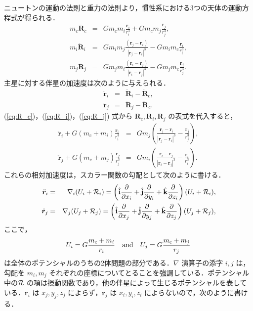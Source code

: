 \documentclass[11pt,a4paper,oneside,onecolumn]{jreport}
\begin{document}
ニュートンの運動の法則と重力の法則より，慣性系における3つの天体の運動方程式が得られる．
\begin{eqnarray}
m_c \ddot{\bm R}_c & = & G m_c m_i \frac{{\bm r}_i}{r_i^3} + G m_c m_j \frac{{\bm r}_j}{r_j^3}, \label{eq:R_c}\\
m_i \ddot{\bm R}_i & = & G m_i m_j \frac{({\bm r}_j - {\bm r}_i)}{|{\bm r}_j - {\bm r}_i|^3} - G m_i m_c \frac{{\bm r}_i}{r_i^3}, \label{eq:R_i}\\
m_j \ddot{\bm R}_j & = & G m_j m_i \frac{({\bm r}_i - {\bm r}_j)}{|{\bm r}_i - {\bm r}_j|^3} - G m_j m_c \frac{{\bm r}_j}{r_j^3}. \label{eq:R_j}
\end{eqnarray}
主星に対する伴星の加速度は次のように与えられる．
\begin{eqnarray}
\ddot{\bm r}_i & = & \ddot{\bm R}_i - \ddot{\bm R}_c, \\
\ddot{\bm r}_j & = & \ddot{\bm R}_j - \ddot{\bm R}_c.
\end{eqnarray}
(\ref{eq:R_c})，(\ref{eq:R_i})，(\ref{eq:R_j}) 式から $\ddot{\bm R}_c, \ddot{\bm R}_i, \ddot{\bm R}_j$ の表式を代入すると，
\begin{eqnarray}
\ddot{\bm r}_i + G (m_c + m_i) \frac{{\bm r}_i}{r_i^3} & = & G m_j \left( \frac{{\bm r}_j - {\bm r}_i}{| {\bm r}_j - {\bm r}_i |^3} - \frac{{\bm r}_j}{r_j^3} \right), \label{eq:r_i} \\ 
\ddot{\bm r}_j + G (m_c + m_j) \frac{{\bm r}_j}{r_j^3} & = & G m_i \left( \frac{{\bm r}_i - {\bm r}_j}{| {\bm r}_i - {\bm r}_j |^3} - \frac{{\bm r}_i}{r_i^3} \right). \label{eq:r_j}
\end{eqnarray}
これらの相対加速度は，スカラー関数の勾配として次のように書ける．
\begin{eqnarray}
\ddot{\bm r}_i & = & \nabla_i (U_i + {\cal R}_i) = \left( \hat{\bf i} \frac{\partial}{\partial x_i} + \hat{{\bf j}} \frac{\partial}{\partial y_i} + \hat{\bf k} \frac{\partial}{\partial z_i} \right) (U_i + {\cal R}_i), \label{eq:r_i_nabla} \\ 
\ddot{\bm r}_j & = & \nabla_j (U_j + {\cal R}_j) = \left( \hat{\bf i} \frac{\partial}{\partial x_j} + \hat{{\bf j}} \frac{\partial}{\partial y_j} + \hat{\bf k} \frac{\partial}{\partial z_j} \right) (U_j + {\cal R}_j), \label{eq:r_j_nabla}
\end{eqnarray}
ここで，
\begin{equation}
U_i = G \frac{m_c + m_i}{r_i} \quad {\rm and} \quad U_j = G \frac{m_c + m_j}{r_j}
\end{equation}
は全体のポテンシャルのうちの2体問題の部分である．$\nabla$ 演算子の添字 $i, j$ は，勾配を $m_i, m_j$ それぞれの座標についてとることを強調している．ポテンシャル中の${\cal R}$ の項は摂動関数であり，他の伴星によって生じるポテンシャルを表している．${\bm r}_i$ は $x_j, y_j, z_j$ によらず，${\bm r}_j$ は $x_i, y_i, z_i$ によらないので，次のように書ける．
\end{document}
